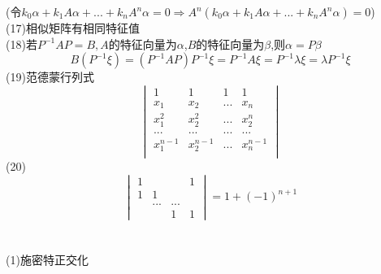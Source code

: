 \documentclass[11pt, a4paper, UTF8]{ctexart}
\begin{document}
(令$k_0\alpha+k_1A\alpha+...+k_nA^n\alpha=0\Rightarrow A^n(k_0\alpha+k_1A\alpha+...+k_nA^n\alpha)=0$)\\
(17)相似矩阵有相同特征值\\
(18)若$P^{-1}AP=B,A$的特征向量为$\alpha$,$B$的特征向量为$\beta$,则$\alpha=P\beta$
\[B(P^{-1}\xi)=(P^{-1}AP)P^{-1}\xi=P^{-1}A\xi=P^{-1}\lambda\xi=\lambda P^{-1}\xi\]
(19)范德蒙行列式\\
\[\begin{vmatrix}
1&1&1&1\\
x_1&x_2&...&x_n\\
x_1^2&x_2^2&...&x_2^n\\
...&...&...&...\\
x_1^{n-1}&x_2^{n-1}&...&x_n^{n-1}\\
\end{vmatrix}\]
(20)
\[\begin{vmatrix}
1&&&1\\
1&1&\\
&...&...&\\
&&1&1
\end{vmatrix}=1+(-1)^{n+1}\]
\section{}
(1)施密特正交化\\
\end{document}
